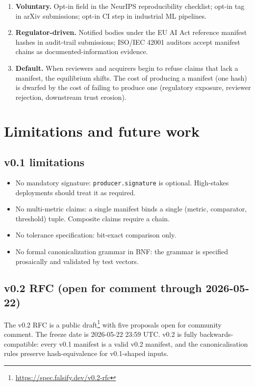 \documentclass[11pt, a4paper]{article}
\begin{document}
\begin{enumerate}[leftmargin=2em, itemsep=0.2em]
  \item \textbf{Voluntary.} Opt-in field in the NeurIPS reproducibility checklist; opt-in tag in arXiv submissions; opt-in CI step in industrial ML pipelines.
  \item \textbf{Regulator-driven.} Notified bodies under the EU AI Act reference manifest hashes in audit-trail submissions; ISO/IEC 42001 auditors accept manifest chains as documented-information evidence.
  \item \textbf{Default.} When reviewers and acquirers begin to refuse claims that lack a manifest, the equilibrium shifts. The cost of producing a manifest (one hash) is dwarfed by the cost of failing to produce one (regulatory exposure, reviewer rejection, downstream trust erosion).
\end{enumerate}

\section{Limitations and future work}
\label{sec:limits}

\subsection{v0.1 limitations}

\begin{itemize}[leftmargin=2em, itemsep=0.2em]
  \item No mandatory signature: \texttt{producer.signature} is optional. High-stakes deployments should treat it as required.
  \item No multi-metric claims: a single manifest binds a single (metric, comparator, threshold) tuple. Composite claims require a chain.
  \item No tolerance specification: bit-exact comparison only.
  \item No formal canonicalization grammar in BNF: the grammar is specified prosaically and validated by test vectors.
\end{itemize}

\subsection{v0.2 RFC (open for comment through 2026-05-22)}

The v0.2 RFC is a public draft\footnote{\url{https://spec.falsify.dev/v0.2-rfc}} with five proposals open for community comment. The freeze date is 2026-05-22 23:59 UTC. v0.2 is fully backwards-compatible: every v0.1 manifest is a valid v0.2 manifest, and the canonicalisation rules preserve hash-equivalence for v0.1-shaped inputs.
\end{document}
